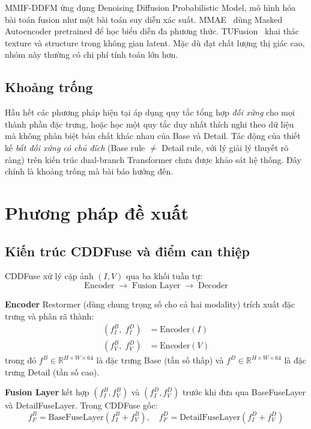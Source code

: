 \documentclass[12pt,a4paper]{article}
\begin{document}
MMIF-DDFM ứng dụng Denoising Diffusion Probabilistic Model, mô hình hóa bài toán
fusion như một bài toán suy diễn xác suất. MMAE~\cite{wang2025mmae} dùng Masked
Autoencoder pretrained để học biểu diễn đa phương thức. TUFusion~\cite{zhao2024tufusion}
khai thác texture và structure trong không gian latent. Mặc dù đạt chất lượng
thị giác cao, nhóm này thường có chi phí tính toán lớn hơn.

\subsection{Khoảng trống}

Hầu hết các phương pháp hiện tại áp dụng quy tắc tổng hợp \emph{đối xứng} cho
mọi thành phần đặc trưng, hoặc học một quy tắc duy nhất thích nghi theo dữ liệu
mà không phân biệt bản chất khác nhau của Base và Detail. Tác động của thiết kế
\emph{bất đối xứng có chủ đích} (Base rule $\neq$ Detail rule, với lý giải lý
thuyết rõ ràng) trên kiến trúc dual-branch Transformer chưa được khảo sát hệ
thống. Đây chính là khoảng trống mà bài báo hướng đến.

\section{Phương pháp đề xuất}
\label{sec:method}

\subsection{Kiến trúc CDDFuse và điểm can thiệp}

CDDFuse xử lý cặp ảnh $(I, V)$ qua ba khối tuần tự:
\[
  \text{Encoder} \;\to\; \text{Fusion Layer} \;\to\; \text{Decoder}
\]

\textbf{Encoder} Restormer (dùng chung trọng số cho cả hai modality) trích xuất
đặc trưng và phân rã thành:
\begin{align}
  (f_I^B,\; f_I^D) &= \mathrm{Encoder}(I) \\
  (f_V^B,\; f_V^D) &= \mathrm{Encoder}(V)
\end{align}
trong đó $f^B \in \mathbb{R}^{H \times W \times 64}$ là đặc trưng Base (tần số
thấp) và $f^D \in \mathbb{R}^{H \times W \times 64}$ là đặc trưng Detail (tần số
cao).

\textbf{Fusion Layer} kết hợp $(f_I^B, f_V^B)$ và $(f_I^D, f_V^D)$ trước khi
đưa qua BaseFuseLayer và DetailFuseLayer. Trong CDDFuse gốc:
\[
  f_F^B = \mathrm{BaseFuseLayer}(f_I^B + f_V^B), \quad
  f_F^D = \mathrm{DetailFuseLayer}(f_I^D + f_V^D)
\]
\end{document}
